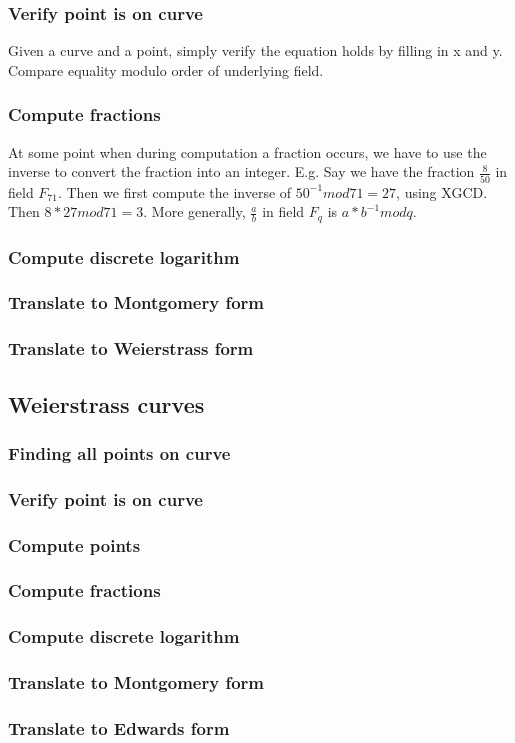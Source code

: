 \documentclass{article}
\begin{document}

\subsubsection{Verify point is on curve}
Given a curve and a point, simply verify the equation holds by filling in x and y.
Compare equality modulo order of underlying field.

\subsubsection{Compute fractions}
At some point when during computation a fraction occurs, we have to use the inverse to convert the fraction into an integer.
E.g. Say we have the fraction $\frac{8}{50}$ in field $F_{71}$. Then we first compute the inverse of $50^{-1} mod 71 = 27$, using XGCD. Then $8*27 mod 71 = 3$. More generally, $\frac{a}{b}$ in field $F_q$ is $a*b^{-1} mod q$.


\subsubsection{Compute discrete logarithm}
\subsubsection{Translate to Montgomery form}
\subsubsection{Translate to Weierstrass form}

\subsection{Weierstrass curves}
\subsubsection{Finding all points on curve}
\subsubsection{Verify point is on curve}
\subsubsection{Compute points}
\subsubsection{Compute fractions}
\subsubsection{Compute discrete logarithm}
\subsubsection{Translate to Montgomery form}
\subsubsection{Translate to Edwards form}
\end{document}
